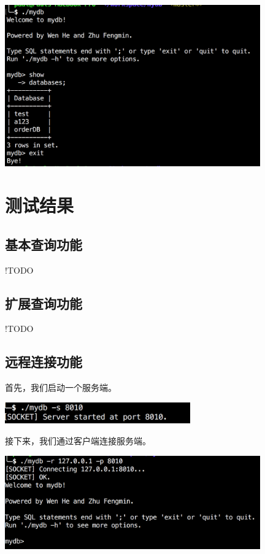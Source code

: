 \documentclass[11pt, a4paper]{article}
\makeatletter
\newcommand\fcaption{\def\@captype{figure}\caption}
\makeatother
\begin{document}
\begin{center}
    \includegraphics[width=11cm]{fig/multi-row}
    \fcaption{交互式终端允许多行输入}\label{inter:multi}
\end{center}

\section{测试结果}

\subsection{基本查询功能}

!TODO

\subsection{扩展查询功能}

!TODO

\subsection{远程连接功能}

首先，我们启动一个服务端。

\begin{center}
    \includegraphics[width=8cm]{fig/server}
    \fcaption{启动服务端}
\end{center}

接下来，我们通过客户端连接服务端。

\begin{center}
    \includegraphics[width=11cm]{fig/conn}
    \fcaption{客户端连接服务端}
\end{center}
\end{document}

